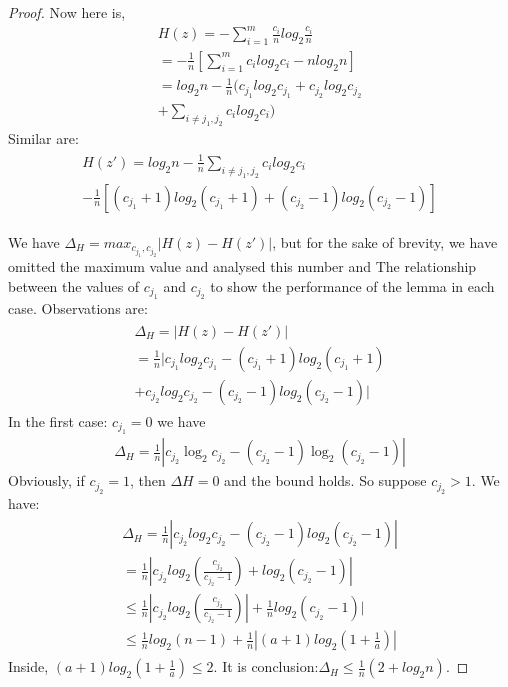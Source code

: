 \begin{proof}
Now here is,
\begin{equation}
\begin{aligned}
H(z) = - \sum^m_{i=1} \frac{c_i}{n} log_2 \frac{c_i}{n} \\
    =  - \frac{1}{n} [\sum^m_{i=1} c_i log_2 c_i - n log_2 n] \\
    = log_2 n - \frac{1}{n} ( c_{j_1} log_2 c_{j_1} + c_{j_2} log_2 c_{j_2}  \\
       + \sum_{i \neq j_1,j_2} c_i log_2 c_i)
\end{aligned}
\end{equation}
Similar are:
\begin{eqnarray}
\begin{aligned}
H(z') = log_2 n - \frac{1}{n} \sum_{i \neq j_1,j_2} c_i log_2 c_i \\
 - \frac{1}{n}[(c_{j_1} + 1)log_2 (c_{j_1} +1) + (c_{j_2} - 1) log_2 (c_{j_2} -1)]
 \end{aligned}
\end{eqnarray}

We have $ \Delta_H = max_{c_{j_1}, c_{j_2}} | H (z)-H (z') | $, but for the sake of brevity, we have omitted the maximum value and analysed this number and  The relationship between the values of $ {c_{j_1}} $ and $ {c_{j_2}} $ to show the performance of the lemma in each case.
Observations are:
	\begin{eqnarray}
	\begin{aligned}
	\Delta_H =  |H(z) - H(z')|  \\
			= \frac{1}{n}|c_{j_1}log_2 {c_{j_1}} - (c_{j_1}+1) log_2 (c_{j_1}+1) \\
			 + c_{j_2}log_2 c_{j_2} - (c_{j_2} -1)log_2(c_{j_2}-1)|
			  \end{aligned}
	\end{eqnarray}	
	In the first case: $ c_{j_1} = 0 $ we have
	  	\begin{eqnarray}
	  \Delta_H = \frac{1}{n}|c_{j_2}\log_2 {c_{j_2}}  - (c_{j_2}-1) \log_2 (c_{j_2}-1)|
	  \end{eqnarray}
	 Obviously, if $ c_{j_2} = 1 $, then $ \Delta H = 0 $ and the bound holds. So suppose $ c_{j_2}> 1 $. We have:
	  	  	\begin{eqnarray}
	  	  	\begin{aligned}	
	  \Delta_H = \frac{1}{n}|c_{j_2}log_2 {c_{j_2}} - (c_{j_2}-1) log_2 (c_{j_2}-1)| \\
	  =  \frac{1}{n} |c_{j_2}log_2(\frac{c_{j_2}}{c_{j_2}-1}) + log_2(c_{j_2}-1)| \\
	  \leq \frac{1}{n} |c_{j_2}log_2(\frac{c_{j_2}}{c_{j_2}-1})| + \frac{1}{n} log_2 (c_{j_2}-1)| \\
	  \leq  \frac{1}{n} log_2(n-1) + \frac{1}{n} |(a+1) log_2 (1+ \frac{1}{a})|
	  			  \end{aligned}
	  \end{eqnarray}
	Inside, $(a + 1) log_2(1 +\frac{1}{a})\leq 2$. It is conclusion:$\Delta_H \leq \frac{1}{n}(2 + log_2 n)$.
	 

\end{proof}

